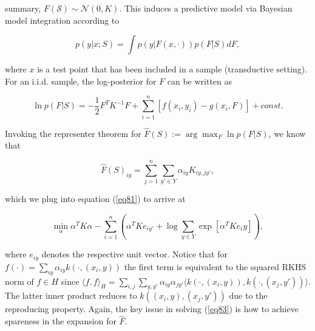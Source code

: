 \documentclass[a4paper,11pt,leqno]{article}
\begin{document}
    \noindent summary, ${F\left(\mathcal{S}\right) \sim \mathcal{N}\left(0,K\right)}$. This induces a predictive model via Bayesian model integration according to

    \begin{equation}
        p(y|x;S)=\int p(y|F(x,\cdot ))p(F|S)dF,
    \end{equation}

    \noindent where $x$ is a test point that has been included in a sample (transductive setting). For an i.i.d. sample, the log-posterior for $F$ can be written as

    \begin{equation}
        \label{eq81}
        \ln p(F|S)=-\frac{1}{2}F^TK^{-1}F+\sum^{n}_{i=1}[f(x_i,y_i)-g(x_i,F)]+const.
    \end{equation}

    \noindent Invoking the representer theorem for $\widehat{F}(S):=\arg\max_F\ln p(F|S)$, we know that

    \begin{equation}
        \widehat{F}(S)_{iy}=\sum^n_{j=1}\sum_{y'\in{Y}}\alpha_{iy}K_{iy,jy'},
    \end{equation}

    \noindent which we plug into equation (\ref{eq81}) to arrive at

    \begin{equation}
        \label{eq83}
        \min_{\alpha}\alpha^TK\alpha-\sum^n_{i=1}(
            \alpha^TKe_{iy'}
            + \log \sum_{y\in Y} \exp[\alpha^TKe_iy]
        ),
    \end{equation}

    \noindent where $e_{iy}$ denotes the respective unit vector. Notice that for $f(\cdot)=\sum_{iy}\alpha_{iy}k(\cdot, (x_i, y))$ the first term is equivalent to the squared RKHS norm of $f\in H$ since
    ${
        \langle f,f\rangle_H=\sum_{i,j}\sum_{y,y'}
        \alpha_{iy}\alpha_{jy'}
        \langle k(\cdot, (x_i, y)), k(\cdot, (x_j, y'))\rangle
    }$. The latter inner product reduces to  ${
        k((x_i, y), (x_j, y'))
    }$ due to the reproducing property. Again, the key issue in solving (\ref{eq83}) is how to achieve spareness in the expansion for $\widehat {F}$.
\end{document}
